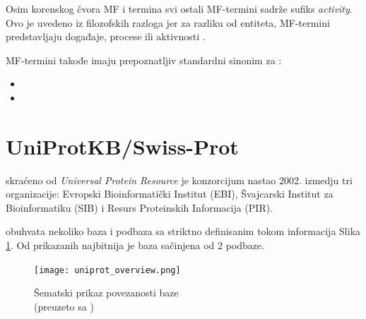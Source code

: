 Osim korenskog čvora MF i  termina svi ostali MF-termini sadrže sufiks \textit{activity}.
Ovo je uvedeno iz filozofskih razloga jer za razliku od entiteta, MF-termini predstavljaju događaje, procese ili aktivnosti \parencite{go_mf}.

MF-termini takođe imaju prepoznatljiv standardni sinonim za  \parencite{go_mf}:
\begin{itemize}
  \item {}
  \item {}
\end{itemize}


\section{UniProtKB/Swiss-Prot}
\label{svis-prot}

\keyword{\uniprot} skraćeno od \textit{Universal Protein Resource} je konzorcijum
nastao 2002. izmedju tri organizacije: Evropski Bioinformatički
Institut (EBI), Švajcarski Institut za Bioinformatiku (SIB) i Resurs
Proteinskih Informacija (PIR).  


\uniprot obuhvata nekoliko baza i podbaza sa striktno definisanim tokom
informacija Slika \ref{fig:uniprot_overview}. Od prikazanih najbitnija je baza
\keyword{\uniprotkb}  sačinjena od 2 podbaze.

\begin{figure}[h!]
  \centering
  \texttt{[image: uniprot\_overview.png]}
  \caption{Šematski prikaz povezanosti \uniprot baze\\ \footnotesize (preuzeto sa \parencite{uniprot_veb})}
  \label{fig:uniprot_overview}
\end{figure}


